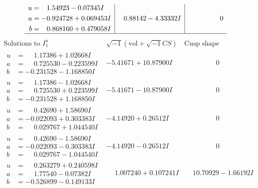 \documentclass[1p]{elsarticle_modified}
\theoremstyle{definition}
\newcommand{\I}{\sqrt{-1}}
\begin{document}
$$\begin{array}{c|c|c}
\begin{aligned}
u &= \phantom{-}1.54923 - 0.07345 I \\
a &= -0.924728 + 0.069453 I \\
b &= \phantom{-}0.868160 + 0.479058 I\end{aligned}
 & \phantom{-}0.88142 - 4.33332 I & \phantom{-0.000000 } 0\\
 \hline 
 \end{array}$$\newpage$$\begin{array}{c|c|c}  
\text{Solutions to }I^u_{1}& \I (\text{vol} + \sqrt{-1}CS) & \text{Cusp shape}\\
 \hline 
\begin{aligned}
u &= \phantom{-}1.17386 + 1.02668 I \\
a &= \phantom{-}0.725530 - 0.223599 I \\
b &= -0.231528 - 1.168850 I\end{aligned}
 & -5.41671 + 10.87900 I & \phantom{-0.000000 } 0 \\ \hline\begin{aligned}
u &= \phantom{-}1.17386 - 1.02668 I \\
a &= \phantom{-}0.725530 + 0.223599 I \\
b &= -0.231528 + 1.168850 I\end{aligned}
 & -5.41671 - 10.87900 I & \phantom{-0.000000 } 0 \\ \hline\begin{aligned}
u &= \phantom{-}0.42690 + 1.58690 I \\
a &= -0.022093 + 0.303383 I \\
b &= \phantom{-}0.029767 + 1.044540 I\end{aligned}
 & -4.14920 + 0.26512 I & \phantom{-0.000000 } 0 \\ \hline\begin{aligned}
u &= \phantom{-}0.42690 - 1.58690 I \\
a &= -0.022093 - 0.303383 I \\
b &= \phantom{-}0.029767 - 1.044540 I\end{aligned}
 & -4.14920 - 0.26512 I & \phantom{-0.000000 } 0 \\ \hline\begin{aligned}
u &= \phantom{-}0.263279 + 0.240598 I \\
a &= \phantom{-}1.77540 - 0.07382 I \\
b &= -0.526899 - 0.149133 I\end{aligned}
 & \phantom{-}1.007240 + 0.107241 I & \phantom{-}10.70929 - 1.66192 I \\ \hline\begin{aligned}

\end{aligned}
\end{array}$$
\end{document}
